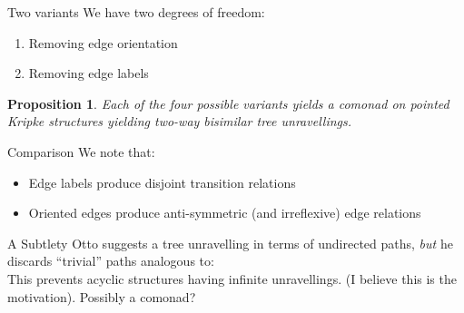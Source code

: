 \documentclass{beamer}
\newtheorem{proposition}{Proposition}
\begin{document}
\begin{frame}{Two variants}
    We have two degrees of freedom:
    \begin{enumerate}
        \item Removing edge orientation
        \item Removing edge labels
    \end{enumerate}
    \begin{proposition}
    Each of the four possible variants yields a comonad on pointed Kripke structures yielding two-way bisimilar tree unravellings.
    \end{proposition}
    \begin{block}{Comparison}
    We note that:
    \begin{itemize}
        \item Edge labels produce disjoint transition relations
        \item Oriented edges produce anti-symmetric (and irreflexive) edge relations
    \end{itemize}
    \end{block}
\end{frame}

\begin{frame}{A Subtlety}
Otto suggests a tree unravelling in terms of undirected paths, \emph{but} he discards ``trivial'' paths analogous to:
\begin{equation*}
    [a \rightarrow b \leftarrow a]
\end{equation*}
This prevents acyclic structures having infinite unravellings. (I believe this is the motivation).
\pause
Possibly a comonad?
\end{frame}
\end{document}
